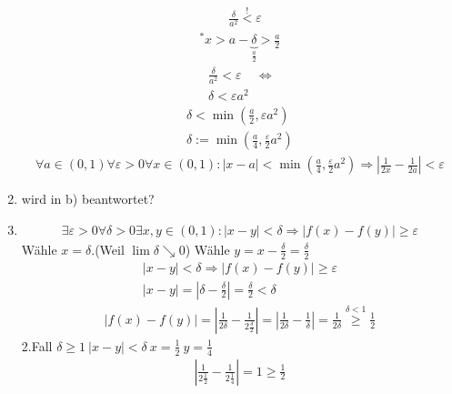 \begin{enumerate}[label = \alph*)]
\begin{align*}
        & \frac{\delta}{a^2} \overset{!}{<} \varepsilon
    \end{align*}
    \begin{align*}
        ^* x > a - \underbrace{\delta}_{\frac{a}{2}} > \frac{a}{2}
    \end{align*}
    \begin{align*}
        \frac{\delta}{a^2} < \varepsilon & \Leftrightarrow\\
        \delta < \varepsilon a^2
    \end{align*}
    \begin{align*}
        \delta < \min(\frac{a}{2}, \varepsilon a^2)\\
        \delta := \min(\frac{a}{4}, \frac{\varepsilon}{2}a^2)
    \end{align*}
    \begin{align*}
        \forall a \in (0,1) \forall \varepsilon > 0 \forall x \in (0,1) : |x - a| < \min(\frac{a}{4}, \frac{\varepsilon}{2}a^2) \Rightarrow |\frac{1}{2x} - \frac{1}{2a}| < \varepsilon
    \end{align*}
    \item wird in b) beantwortet?
    \item \begin{align*}
        \exists \varepsilon > 0 \forall \delta > 0 \exists x, y \in (0,1): |x- y| < \delta \Rightarrow |f(x) - f(y)| \geq \varepsilon
    \end{align*}
    Wähle $x = \delta$.(Weil $\lim \delta \searrow 0$) Wähle $y = x - \frac{\delta}{2} = \frac{\delta}{2}$
    \begin{align*}
        |x - y| < \delta \Rightarrow |f(x) - f(y)| \geq \varepsilon\\
        |x - y| = |\delta - \frac{\delta}{2}| = \frac{\delta}{2} < \delta
    \end{align*}
    \begin{align*}
        |f(x) - f(y)| = |\frac{1}{2\delta} - \frac{1}{2 \frac{\delta}{2}}| = |\frac{1}{2\delta} - \frac{1}{\delta}| = \frac{1}{2\delta} \overset{\delta < 1}{\geq} \frac{1}{2}
    \end{align*}
    2.Fall $\delta \geq 1 \: |x - y| < \delta \: x = \frac{1}{2} \: y = \frac{1}{4}$
    \begin{align*}
        |\frac{1}{2\frac{1}{2}} - \frac{1}{2 \frac{1}{4}}| = 1 \geq \frac{1}{2}
    \end{align*}
\end{enumerate}